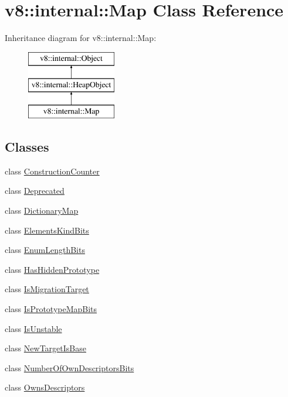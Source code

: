 \hypertarget{classv8_1_1internal_1_1_map}{}\section{v8\+:\+:internal\+:\+:Map Class Reference}
\label{classv8_1_1internal_1_1_map}
Inheritance diagram for v8\+:\+:internal\+:\+:Map\+:\begin{figure}[H]
\begin{center}
\leavevmode
\includegraphics[height=3.000000cm]{classv8_1_1internal_1_1_map}
\end{center}
\end{figure}
\subsection*{Classes}
\begin{DoxyCompactItemize}
\item 
class \hyperlink{classv8_1_1internal_1_1_map_1_1_construction_counter}{Construction\+Counter}
\item 
class \hyperlink{classv8_1_1internal_1_1_map_1_1_deprecated}{Deprecated}
\item 
class \hyperlink{classv8_1_1internal_1_1_map_1_1_dictionary_map}{Dictionary\+Map}
\item 
class \hyperlink{classv8_1_1internal_1_1_map_1_1_elements_kind_bits}{Elements\+Kind\+Bits}
\item 
class \hyperlink{classv8_1_1internal_1_1_map_1_1_enum_length_bits}{Enum\+Length\+Bits}
\item 
class \hyperlink{classv8_1_1internal_1_1_map_1_1_has_hidden_prototype}{Has\+Hidden\+Prototype}
\item 
class \hyperlink{classv8_1_1internal_1_1_map_1_1_is_migration_target}{Is\+Migration\+Target}
\item 
class \hyperlink{classv8_1_1internal_1_1_map_1_1_is_prototype_map_bits}{Is\+Prototype\+Map\+Bits}
\item 
class \hyperlink{classv8_1_1internal_1_1_map_1_1_is_unstable}{Is\+Unstable}
\item 
class \hyperlink{classv8_1_1internal_1_1_map_1_1_new_target_is_base}{New\+Target\+Is\+Base}
\item 
class \hyperlink{classv8_1_1internal_1_1_map_1_1_number_of_own_descriptors_bits}{Number\+Of\+Own\+Descriptors\+Bits}
\item 
class \hyperlink{classv8_1_1internal_1_1_map_1_1_owns_descriptors}{Owns\+Descriptors}
\end{DoxyCompactItemize}
